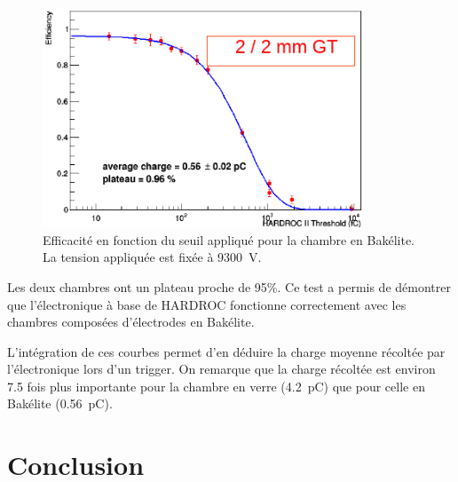 \begin{figure}[ht!]
	\centering
	\includegraphics[width=0.85\textwidth]{GLA/effithrbak.png}
	\captionsetup{type=figure}\caption{Efficacité en fonction du seuil appliqué pour la chambre en Bakélite. La tension appliquée est fixée à \SI{9300}{\volt}.}
	\label{effithrbak}
\end{figure}

Les deux chambres ont un plateau proche de \num{95}\%. Ce test a permis de démontrer que l'électronique à base de HARDROC fonctionne correctement avec les chambres composées d'électrodes en Bakélite.

L'intégration de ces courbes permet d'en déduire la charge moyenne récoltée par l'électronique lors d'un trigger. On remarque que la charge récoltée est environ \num{7.5} fois plus importante pour la chambre en verre (\SI{4.2}{\pico\coulomb}) que pour celle en Bakélite (\SI{0.56}{\pico\coulomb}).

\section{Conclusion}

